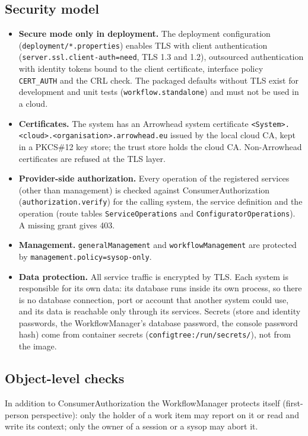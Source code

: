 \documentclass[a4paper]{arrowhead}
\begin{document}
\subsection{Security model}
\begin{itemize}
\item \textbf{Secure mode only in deployment.} The deployment configuration (\texttt{deployment/\allowbreak{}*.\allowbreak{}properties}) enables
TLS with client authentication (\texttt{server.\allowbreak{}ssl.\allowbreak{}client-\allowbreak{}auth=\allowbreak{}need}, TLS 1.3 and 1.2), outsourced authentication with
identity tokens bound to the client certificate, interface policy \texttt{CERT\_AUTH} and the CRL check. The packaged
defaults without TLS exist for development and unit tests (\texttt{workflow.\allowbreak{}standalone}) and must not be used in a
cloud.
\item \textbf{Certificates.} The system has an Arrowhead system certificate
\texttt{<System>.\allowbreak{}<cloud>.\allowbreak{}<organisation>.\allowbreak{}arrowhead.\allowbreak{}eu} issued by the local cloud CA, kept in a PKCS\#12 key store; the
trust store holds the cloud CA. Non-Arrowhead certificates are refused at the TLS layer.
\item \textbf{Provider-side authorization.} Every operation of the registered services (other than management) is
checked against ConsumerAuthorization (\texttt{authorization.\allowbreak{}verify}) for the calling system, the service definition
and the operation (route tables \texttt{Service\allowbreak{}Operations} and \texttt{Configurator\allowbreak{}Operations}). A missing grant gives
403.
\item \textbf{Management.} \texttt{general\allowbreak{}Management} and \texttt{workflow\allowbreak{}Management} are protected by
\texttt{management.\allowbreak{}policy=\allowbreak{}sysop-\allowbreak{}only}.
\item \textbf{Data protection.} All service traffic is encrypted by TLS. Each system is responsible for its own data:
its database runs inside its own process, so there is no database connection, port or account that another system could
use, and its data is reachable only through its services. Secrets (store and identity passwords, the WorkflowManager's
database password, the console password hash) come from container secrets (\texttt{configtree:/\allowbreak{}run/\allowbreak{}secrets/}), not from
the image.
\end{itemize}


\subsection{Object-level checks}
In addition to ConsumerAuthorization the WorkflowManager protects itself (first-person perspective): only the holder of
a work item may report on it or read and write its context; only the owner of a session or a sysop may abort it.
\end{document}
